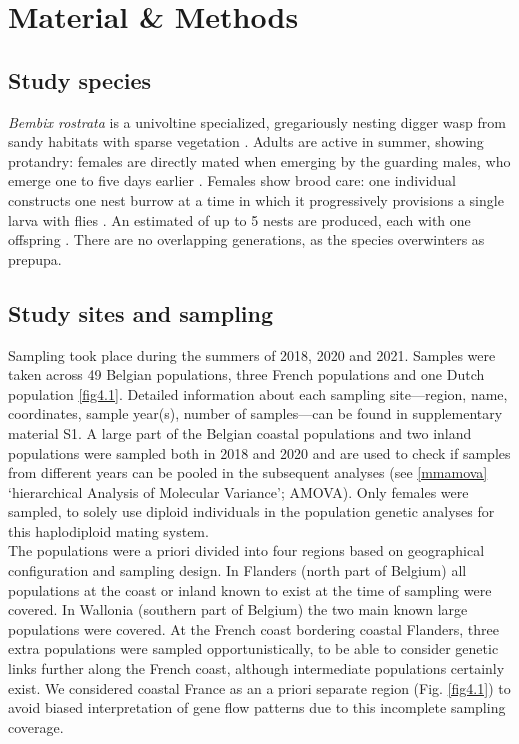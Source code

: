 \documentclass[10pt, twoside]{book} %
\begin{document}
	\section{Material \& Methods}
	
	\subsection{Study species}
	\textit{Bembix rostrata} is a univoltine specialized, gregariously nesting digger wasp from sandy habitats with sparse vegetation \citep{larsson1986, klein2004}. Adults are active in summer, showing protandry: females are directly mated when emerging by the guarding males, who emerge one to five days earlier \citep{wiklund1977, schone1981, evans2007}. Females show brood care: one individual constructs one nest burrow at a time in which it progressively provisions a single larva with flies \citep{nielsen1945, field2020}. An estimated of up to 5 nests are produced, each with one offspring \citep{larsson1989}. There are no overlapping generations, as the species overwinters as prepupa.\\
	
	\subsection{Study sites and sampling}
	Sampling took place during the summers of 2018, 2020 and 2021. Samples were taken across 49 Belgian populations, three French populations and one Dutch population \ref{fig4.1}. Detailed information about each sampling site---region, name, coordinates, sample year(s), number of samples---can be found in supplementary material S1. A large part of the Belgian coastal populations and two inland populations were sampled both in 2018 and 2020 and are used to check if samples from different years can be pooled in the subsequent analyses (see \ref{mmamova} `hierarchical Analysis of Molecular Variance'; AMOVA). Only females were sampled, to solely use diploid individuals in the population genetic analyses for this haplodiploid mating system.\\
	
	The populations were a priori divided into four regions based on geographical configuration and sampling design. In Flanders (north part of Belgium) all populations at the coast or inland known to exist at the time of sampling were covered. In Wallonia (southern part of Belgium) the two main known large populations were covered. At the French coast bordering coastal Flanders, three extra populations were sampled opportunistically, to be able to consider genetic links further along the French coast, although intermediate populations certainly exist. We considered coastal France as an a priori separate region (Fig. \ref{fig4.1}) to avoid biased interpretation of gene flow patterns due to this incomplete sampling coverage.\\
	
\end{document}
